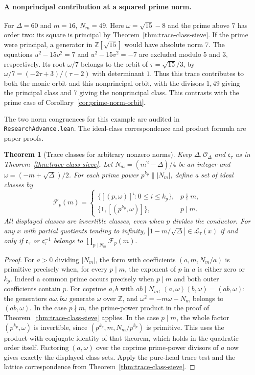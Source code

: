 \documentclass[11pt]{amsart}
\newtheorem{theorem}{Theorem}[section]
\theoremstyle{definition}
\theoremstyle{remark}
\numberwithin{equation}{section}
\newcommand{\Z}{\mathbb{Z}}
\begin{document}
\paragraph{A nonprincipal contribution at a squared prime norm.}
For $\Delta=60$ and $m=16$, $N_m=49$. Here $\omega=\sqrt{15}-8$
and the prime above $7$ has order two: its square is principal by
Theorem~\ref{thm:trace-class-sieve}. If the prime were principal,
a generator in $\Z[\sqrt{15}]$ would have absolute norm $7$.
The equations $u^2-15v^2=7$ and $u^2-15v^2=-7$ are excluded modulo
$5$ and $3$, respectively. Its root $\omega/7$ belongs to the
orbit of $\tau=\sqrt{15}/3$, by
$\omega/7=(-2\tau+3)/(\tau-2)$ with determinant $1$.
Thus this trace contributes to both the monic orbit and this
nonprincipal orbit, with the divisors $1,49$ giving the principal
class and $7$ giving the nonprincipal class. This contrasts with
the prime case of Corollary~\ref{cor:prime-norm-orbit}.

The two norm congruences for this example are audited in
\texttt{ResearchAdvance.lean}. The ideal-class correspondence and
product formula are paper proofs.



\begin{theorem}[Trace classes for arbitrary nonzero norms]
\label{thm:trace-all-norms}
Keep $\Delta,\mathcal O_\Delta$ and $\mathfrak c_\tau$ as in
Theorem~\ref{thm:trace-class-sieve}. Let $N_m=(m^2-\Delta)/4$ be an
integer and $\omega=(-m+\sqrt\Delta)/2$. For each prime power
$p^{k_p}\parallel |N_m|$, define a set of ideal classes by
\[
 \mathcal F_p(m)=
 \begin{cases}
 \{[(p,\omega)]^i:0\le i\le k_p\},&p\nmid m,\\
 \{1,[(p^{k_p},\omega)]\},&p\mid m .
 \end{cases}
\]
All displayed classes are invertible classes, even when $p$
divides the conductor. For any $x$ with partial quotients tending
to infinity, $|1-m/\sqrt\Delta|\in\mathcal L_\tau(x)$ if and only
if $\mathfrak c_\tau$ or $\mathfrak c_\tau^{-1}$
belongs to $\prod_{p\mid N_m}\mathcal F_p(m)$.
\end{theorem}
\begin{proof}
For $a>0$ dividing $|N_m|$, the form with coefficients
$(a,m,N_m/a)$ is primitive precisely when, for every $p\mid m$,
the exponent of $p$ in $a$ is either zero or $k_p$.
Indeed a common prime occurs precisely when $p\mid m$ and both
outer coefficients contain $p$.
For coprime $a,b$ with $ab\mid N_m$,
$(a,\omega)(b,\omega)=(ab,\omega)$:
the generators $a\omega,b\omega$ generate $\omega$ over $\Z$,
and $\omega^2=-m\omega-N_m$ belongs to $(ab,\omega)$.
In the case $p\nmid m$, the prime-power product in the proof of
Theorem~\ref{thm:trace-class-sieve} applies. In the case $p\mid m$,
the whole factor $(p^{k_p},\omega)$ is invertible, since
$(p^{k_p},m,N_m/p^{k_p})$ is primitive. This uses the
product-with-conjugate identity of that theorem, which holds
in the quadratic order itself. Factoring $(a,\omega)$ over the
coprime prime-power divisors of $a$ now gives exactly the displayed
class sets. Apply the pure-head trace test and the lattice
correspondence from Theorem~\ref{thm:trace-class-sieve}.
\end{proof}
\end{document}
